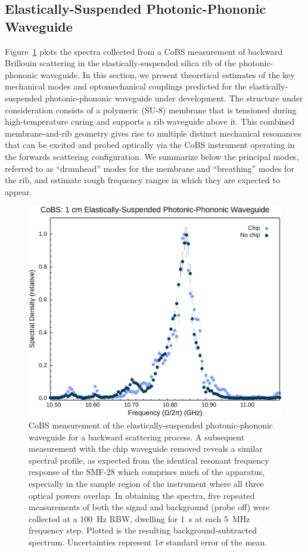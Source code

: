 \subsection{Elastically-Suspended Photonic-Phononic Waveguide}
\label{subsec:Raman:Target:WigglyWaveguide}

Figure~\ref{fig:Raman:wigglyCoBSspectra} plots the spectra collected from a \ac{CoBS} measurement of backward Brillouin scattering in the elastically-suspended silica rib of the photonic-phononic waveguide. In this section, we present theoretical estimates of the key mechanical modes and optomechanical couplings predicted for the elastically-suspended photonic-phononic waveguide under development. The structure under consideration consists of a polymeric (SU-8) membrane that is tensioned during high-temperature curing and supports a rib waveguide above it. This combined membrane-and-rib geometry gives rise to multiple distinct mechanical resonances that can be excited and probed optically via the \ac{CoBS} instrument operating in the forwards scattering configuration. We summarize below the principal modes, referred to as ``drumhead'' modes for the membrane and ``breathing'' modes for the rib, and estimate rough frequency ranges in which they are expected to appear.

\begin{figure}[t]
  \centering
  \hspace{-2em}\includegraphics[width=.85\textwidth]{figs/4-Raman/CoBS: 1 cm Elastically-Suspended Photonic-Phononic Waveguide.png}
  \caption{\ac{CoBS} measurement of the elastically-suspended photonic-phononic waveguide for a backward scattering process. A subsequent measurement with the chip waveguide removed reveals a similar spectral profile, as expected from the identical resonant frequency response of the \ac{SMF-28} which comprises much of the apparatus, especially in the sample region of the instrument where all three optical powers overlap. In obtaining the spectra, five repeated measurements of both the signal and background (probe off) were collected at a \SI{100}{\hertz} \ac{RBW}, dwelling for \SI{1}{\second} at each \SI{5}{\mega\hertz} frequency step. Plotted is the resulting background-subtracted spectrum. Uncertainties represent 1\(\sigma\) standard error of the mean.}
  \label{fig:Raman:wigglyCoBSspectra}
\end{figure}

